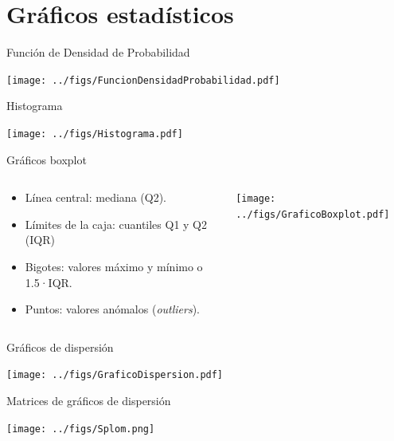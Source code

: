 \documentclass[aspectratio=169, usenames,svgnames,dvipsnames]{beamer}
\begin{document}
\section{Gráficos estadísticos}
\label{sec:orgb15c4a6}


\begin{frame}[label={sec:orga6ba832}]{Función de Densidad de Probabilidad}
\begin{center}
\texttt{[image: ../figs/FuncionDensidadProbabilidad.pdf]}
\end{center}
\end{frame}

\begin{frame}[label={sec:org9c8bf09}]{Histograma}
\begin{center}
\texttt{[image: ../figs/Histograma.pdf]}
\end{center}
\end{frame}


\begin{frame}[label={sec:orgbc984d9}]{Gráficos boxplot}
\begin{columns}
\begin{column}{0.5\columnwidth}
\begin{itemize}
\item Línea central: mediana (Q2).
\item Límites de la caja: cuantiles Q1 y Q2 (IQR)
\item Bigotes: valores máximo y mínimo o 1.5·IQR.
\item Puntos: valores anómalos (\emph{outliers}).
\end{itemize}
\end{column}

\begin{column}{0.5\columnwidth}
\begin{center}
\texttt{[image: ../figs/GraficoBoxplot.pdf]}
\end{center}
\end{column}
\end{columns}
\end{frame}

\begin{frame}[label={sec:orgc96a3f9}]{Gráficos de dispersión}
\begin{center}
\texttt{[image: ../figs/GraficoDispersion.pdf]}
\end{center}
\end{frame}


\begin{frame}[label={sec:org4913886}]{Matrices de gráficos de dispersión}
\begin{center}
\texttt{[image: ../figs/Splom.png]}
\end{center}
\end{frame}
\end{document}
